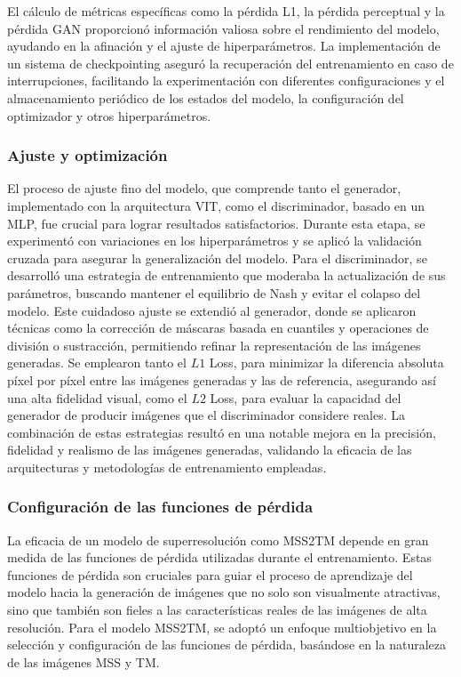                 El cálculo de métricas específicas como la pérdida L1, la pérdida perceptual y la pérdida GAN proporcionó información valiosa sobre el rendimiento del modelo, ayudando en la afinación y el ajuste de hiperparámetros. La implementación de un sistema de checkpointing aseguró la recuperación del entrenamiento en caso de interrupciones, facilitando la experimentación con diferentes configuraciones y el almacenamiento periódico de los estados del modelo, la configuración del optimizador y otros hiperparámetros.

            \subsubsection{Ajuste y optimización}
                El proceso de ajuste fino del modelo, que comprende tanto el generador, implementado con la arquitectura VIT, como el discriminador, basado en un MLP, fue crucial para lograr resultados satisfactorios. Durante esta etapa, se experimentó con variaciones en los hiperparámetros y se aplicó la validación cruzada para asegurar la generalización del modelo. Para el discriminador, se desarrolló una estrategia de entrenamiento que moderaba la actualización de sus parámetros, buscando mantener el equilibrio de Nash y evitar el colapso del modelo. Este cuidadoso ajuste se extendió al generador, donde se aplicaron técnicas como la corrección de máscaras basada en cuantiles y operaciones de división o sustracción, permitiendo refinar la representación de las imágenes generadas. Se emplearon tanto el \(L1\) Loss, para minimizar la diferencia absoluta píxel por píxel entre las imágenes generadas y las de referencia, asegurando así una alta fidelidad visual, como el \(L2\) Loss, para evaluar la capacidad del generador de producir imágenes que el discriminador considere reales. La combinación de estas estrategias resultó en una notable mejora en la precisión, fidelidad y realismo de las imágenes generadas, validando la eficacia de las arquitecturas y metodologías de entrenamiento empleadas.

            
                \subsubsection{Configuración de las funciones de pérdida}
                    La eficacia de un modelo de superresolución como MSS2TM depende en gran medida de las funciones de pérdida utilizadas durante el entrenamiento. Estas funciones de pérdida son cruciales para guiar el proceso de aprendizaje del modelo hacia la generación de imágenes que no solo son visualmente atractivas, sino que también son fieles a las características reales de las imágenes de alta resolución. Para el modelo MSS2TM, se adoptó un enfoque multiobjetivo en la selección y configuración de las funciones de pérdida, basándose en la naturaleza de las imágenes MSS y TM.
                
